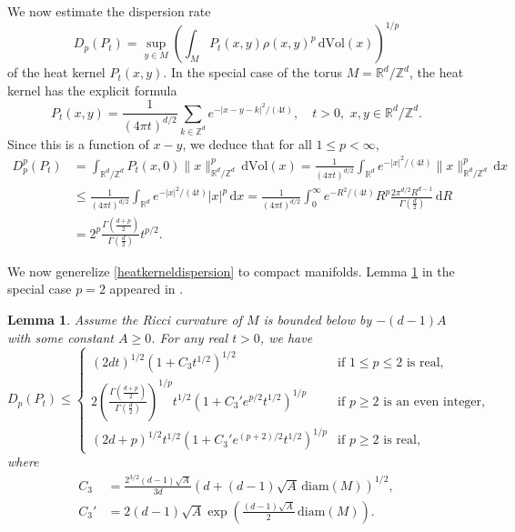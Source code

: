 \documentclass[11pt,a4paper]{article}
\newtheorem{lem}[thm]{Lemma}
\theoremstyle{definition}
\begin{document}
We now estimate the dispersion rate
\[ D_p (P_t) = \sup_{y \in M} \left( \int_M P_t (x,y) \rho(x,y)^p \, \mathrm{d}\mathrm{Vol}(x) \right)^{1/p} \]
of the heat kernel $P_t (x,y)$. In the special case of the torus $M=\mathbb{R}^d/\mathbb{Z}^d$, the heat kernel has the explicit formula \cite[Section 4.4.2]{GF}
\[ P_t (x,y) = \frac{1}{(4 \pi t)^{d/2}} \sum_{k \in \mathbb{Z}^d} e^{-|x-y-k|^2/(4t)}, \quad t>0, \,\, x,y \in \mathbb{R}^d / \mathbb{Z}^d . \]
Since this is a function of $x-y$, we deduce that for all $1 \le p < \infty$,
\begin{equation}\label{heatkerneldispersion}
\begin{split} D_p^p (P_t) &= \int_{\mathbb{R}^d / \mathbb{Z}^d} P_t (x,0) \| x \|_{\mathbb{R}^d / \mathbb{Z}^d}^p \, \mathrm{d}\mathrm{Vol}(x) = \frac{1}{(4 \pi t)^{d/2}} \int_{\mathbb{R}^d} e^{-|x|^2/(4t)} \| x \|_{\mathbb{R}^d / \mathbb{Z}^d}^p \, \mathrm{d}x \\ &\le \frac{1}{(4 \pi t)^{d/2}} \int_{\mathbb{R}^d} e^{-|x|^2/(4t)} |x|^p \, \mathrm{d} x = \frac{1}{(4 \pi t)^{d/2}} \int_0^{\infty} e^{-R^2/(4t)} R^p \frac{2 \pi^{d/2}R^{d-1}}{\Gamma \left( \frac{d}{2} \right)} \, \mathrm{d}R \\ &= 2^p \frac{\Gamma \left( \frac{d+p}{2} \right)}{\Gamma \left( \frac{d}{2} \right)} t^{p/2} . \end{split}
\end{equation}

We now generelize \eqref{heatkerneldispersion} to compact manifolds. Lemma \ref{heatkerneldispersionlemma} in the special case $p=2$ appeared in \cite{BOR2}.
\begin{lem}\label{heatkerneldispersionlemma} Assume the Ricci curvature of $M$ is bounded below by $-(d-1)A$ with some constant $A \ge 0$. For any real $t>0$, we have
\[ D_p (P_t) \le \left\{ \begin{array}{ll} \displaystyle{(2dt)^{1/2} \left(1+C_3 t^{1/2} \right)^{1/2}} & \textrm{if } 1 \le p \le 2 \textrm{ is real}, \\ \displaystyle{2 \left( \frac{\Gamma \left( \frac{d+p}{2} \right)}{\Gamma \left( \frac{d}{2} \right)} \right)^{1/p} t^{1/2} \left( 1+C_3' e^{p/2} t^{1/2} \right)^{1/p}} & \textrm{if } p \ge 2 \textrm{ is an even integer}, \\ \displaystyle{(2d+p)^{1/2} t^{1/2} \left( 1+C_3' e^{(p+2)/2} t^{1/2} \right)^{1/p}} & \textrm{if } p \ge 2 \textrm{ is real,} \end{array} \right. \]
where
\[ \begin{split} C_3 &= \frac{2^{3/2}(d-1) \sqrt{A}}{3d} \left( d + (d-1) \sqrt{A} \, \mathrm{diam}(M) \right)^{1/2}, \\ C_3' &= 2 (d-1) \sqrt{A} \exp \left( \frac{(d-1)\sqrt{A}}{2} \, \mathrm{diam} (M) \right) . \end{split} \]
\end{lem}
\end{document}
